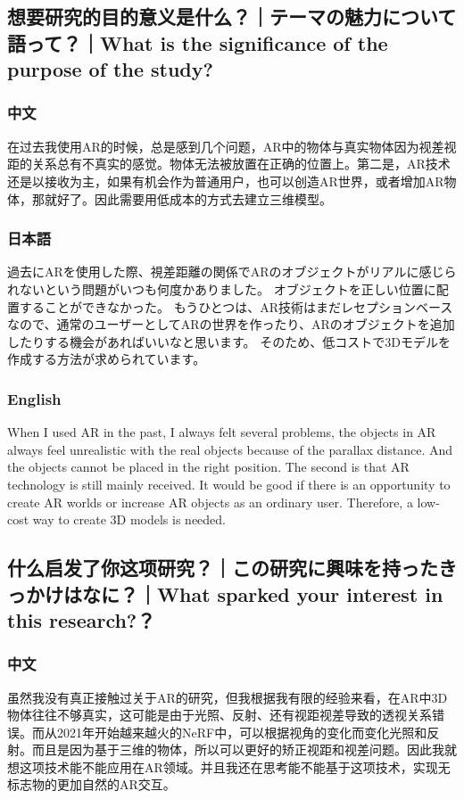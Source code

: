 \documentclass[lang=cn,11pt,a4paper]{elegantpaper}
\begin{document}
\subsection{想要研究的目的意义是什么？｜テーマの魅力について語って？｜What is the significance of the purpose of the study?}
\subsubsection{中文}
在过去我使用AR的时候，总是感到几个问题，AR中的物体与真实物体因为视差视距的关系总有不真实的感觉。物体无法被放置在正确的位置上。第二是，AR技术还是以接收为主，如果有机会作为普通用户，也可以创造AR世界，或者增加AR物体，那就好了。因此需要用低成本的方式去建立三维模型。
\subsubsection{日本語}
過去にARを使用した際、視差距離の関係でARのオブジェクトがリアルに感じられないという問題がいつも何度かありました。 オブジェクトを正しい位置に配置することができなかった。 もうひとつは、AR技術はまだレセプションベースなので、通常のユーザーとしてARの世界を作ったり、ARのオブジェクトを追加したりする機会があればいいなと思います。 そのため、低コストで3Dモデルを作成する方法が求められています。
\subsubsection{English}
When I used AR in the past, I always felt several problems, the objects in AR always feel unrealistic with the real objects because of the parallax distance. And the objects cannot be placed in the right position. The second is that AR technology is still mainly received. It would be good if there is an opportunity to create AR worlds or increase AR objects as an ordinary user. Therefore, a low-cost way to create 3D models is needed.

\subsection{什么启发了你这项研究？｜この研究に興味を持ったきっかけはなに？｜What sparked your interest in this research?？}
\subsubsection{中文}
虽然我没有真正接触过关于AR的研究，但我根据我有限的经验来看，在AR中3D物体往往不够真实，这可能是由于光照、反射、还有视距视差导致的透视关系错误。而从2021年开始越来越火的NeRF中，可以根据视角的变化而变化光照和反射。而且是因为基于三维的物体，所以可以更好的矫正视距和视差问题。因此我就想这项技术能不能应用在AR领域。并且我还在思考能不能基于这项技术，实现无标志物的更加自然的AR交互。
\end{document}
